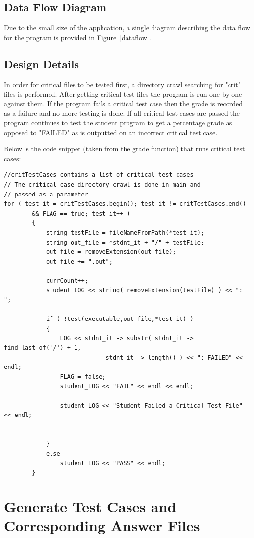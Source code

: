\subsection{Data Flow Diagram}
Due to the small size of the application, a single diagram
describing the data flow for the program is provided in Figure~\ref{dataflow}.

\subsection{Design Details}
In order for critical files to be tested first, a directory crawl searching for
"crit" files is performed. After getting critical test files the program is run
one by one against them. If the program fails a critical test case then the grade
is recorded as a failure and no more testing is done. If all critical test cases
are passed the program continues to test the student program to get a percentage
grade as opposed to "FAILED" as is outputted on an incorrect critical test case.

Below is the code snippet (taken from the grade function) that runs critical test
cases:

\begin{lstlisting}
//critTestCases contains a list of critical test cases
// The critical case directory crawl is done in main and
// passed as a parameter
for ( test_it = critTestCases.begin(); test_it != critTestCases.end() 
		&& FLAG == true; test_it++ )
        {
            string testFile = fileNameFromPath(*test_it);
            string out_file = *stdnt_it + "/" + testFile;
            out_file = removeExtension(out_file);
            out_file += ".out";

            currCount++;
            student_LOG << string( removeExtension(testFile) ) << ": ";

            if ( !test(executable,out_file,*test_it) )
            {
                LOG << stdnt_it -> substr( stdnt_it -> find_last_of('/') + 1,
                			 stdnt_it -> length() ) << ": FAILED" << endl;
                FLAG = false;
                student_LOG << "FAIL" << endl << endl;

                student_LOG << "Student Failed a Critical Test File" << endl;


            }
            else
                student_LOG << "PASS" << endl;
        }
\end{lstlisting}

 
\section{Generate Test Cases and Corresponding Answer Files}

